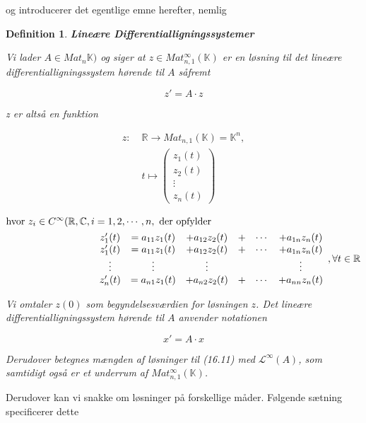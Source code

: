 \documentclass[paper=a4, fontsize=11pt]{scrartcl} %
\newtheorem*{definition}{Definition}
\newenvironment{cstmdefinition}[1]{\begin{definition} {\normalfont\textbf{#1}}}{\end{definition}}
\begin{document}
	og introducerer det egentlige emne herefter, nemlig
	
	
	\begin{cstmdefinition}{Lineære Differentialligningssystemer}
		
		
		Vi lader $A \in Mat_n{\mathbb{K}})$ og siger at $z \in Mat_{n,1}^{\infty}(\mathbb{K})$ er en løsning til det lineære differentialligningssystem hørende til $A$ såfremt
		
		\[z' = A \cdot z\]
		
		z er altså en funktion
		
		\begin{align*}
			z: \; &\mathbb{R} \rightarrow Mat_{n,1}(\mathbb{K}) = \mathbb{K}^n,\\
			&t \mapsto 
			\begin{pmatrix} 
				z_1(t) \\ z_2(t) \\ \vdots \\ z_n(t)
			\end{pmatrix} 
		\end{align*}
		
		\begin{align*}
			\mbox{hvor } z_i \in C^{\infty}(\mathbb{R},\mathbb{C}, i &= 1,2, \cdots, n,\mbox{ der opfylder}\\
			&\begin{array}{c c c c c c}
				z'_1(t) &= a_{11}z_1(t) &+ a_{12}z_2(t) &+ &\cdots &+ a_{1n}z_n(t)\\
				z'_1(t) &= a_{11}z_1(t) &+ a_{12}z_2(t) &+ &\cdots &+ a_{1n}z_n(t)	\\
				\vdots  & \vdots & \vdots & & & \vdots\\
				z'_n(t) &= a_{n1}z_1(t) &+ a_{n2}z_2(t) &+ &\cdots &+ a_{nn}z_n(t)
			\end{array}, \forall t \in \mathbb{R} 
		\end{align*}
		
		Vi omtaler $z(0)$ som begyndelsesværdien for løsningen $z$. Det lineære differentialligningssystem hørende til $A$ anvender notationen
		
		\[x' = A \cdot x \tag{16.11}\]
		
		Derudover betegnes mængden af løsninger til (16.11) med $\mathcal{L}^{\infty}(A)$, som samtidigt også er et underrum af $Mat_{n,1}^{\infty}(\mathbb{K})$.  
		
	\end{cstmdefinition}
	
	
	Derudover kan vi snakke om løsninger på forskellige måder. Følgende sætning specificerer dette
	
\end{document}
